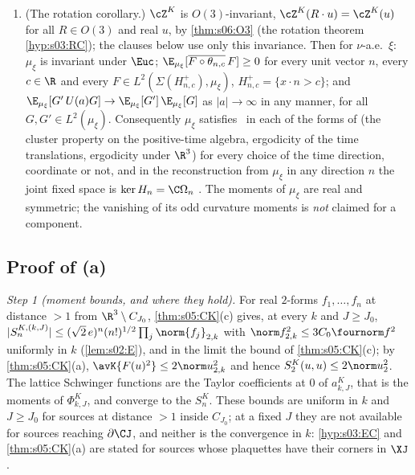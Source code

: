 \begin{theorem}
\begin{enumerate}[label=\textup{(\alph*)},leftmargin=*]
\item \textup{(The rotation corollary.)} $\cZ^K$ is $O(3)$-invariant, $\cZ^K(R\cdot u)=\cZ^K(u)$ for all $R\in O(3)$ and real $u$, by \cref{thm:s06:O3} (the rotation theorem \cref{hyp:s03:RC}); the clauses below use only this invariance. Then for $\nu$-a.e.\ $\xi$: $\mu_\xi$ is invariant under $\Euc$; $\E_{\mu_\xi}[\overline{F\circ\theta_{n,c}}\,F]\ge0$ for every unit vector $n$, every $c\in\R$ and every $F\in L^2(\Sigma(H^+_{n,c}),\mu_\xi)$, $H^+_{n,c}=\{x\cdot n>c\}$; and $\E_{\mu_\xi}[G'\,U(a)G]\to\E_{\mu_\xi}[G']\,\E_{\mu_\xi}[G]$ as $|a|\to\infty$ in any manner, for all $G,G'\in L^2(\mu_\xi)$. Consequently $\mu_\xi$ satisfies \OSf\ in each of the forms of \cite[def:OS4, add:OS4]{SymPhase} (the cluster property on the positive-time algebra, ergodicity of the time translations, ergodicity under $\R^3$) for every choice of the time direction, coordinate or not, and in the reconstruction from $\mu_\xi$ in any direction $n$ the joint fixed space is $\ker H_n=\C\Omega_n$ \cite[p:cor:rotcor]{SymPhase}. The moments of $\mu_\xi$ are real and symmetric; the vanishing of its odd curvature moments is \emph{not} claimed for a component.
\end{enumerate}
\end{theorem}

\subsection{Proof of (a)}

\emph{Step 1 (moment bounds, and where they hold).} For real $2$-forms $f_1,\dots,f_n$ at distance $>1$ from $\R^3\setminus C_{J_0}$, \cref{thm:s05:CK}(c) gives, at every $k$ and $J\ge J_0$, $|S^{K,(k,J)}_n|\le(\sqrt2\,e)^n(n!)^{1/2}\prod_j\norm{f_j}_{2,k}$ with $\norm f_{2,k}^2\le3C_0\fournorm f^2$ uniformly in $k$ (\cref{lem:s02:E}), and in the limit the bound of \cref{thm:s05:CK}(c); by \cref{thm:s05:CK}(a), $\avK{F(u)^2}\le2\norm u^2_{2,k}$ and hence $S^K_2(u,u)\le2\norm u_2^2$. The lattice Schwinger functions are the Taylor coefficients at $0$ of $a^K_{k,J}$, that is the moments of $\Phi^K_{k,J}$, and converge to the $S^K_n$. These bounds are uniform in $k$ and $J\ge J_0$ for sources at distance $>1$ inside $C_{J_0}$; at a fixed $J$ they are not available for sources reaching $\partial\CJ$, and neither is the convergence in $k$: \cref{hyp:s03:EC} and \cref{thm:s05:CK}(a) are stated for sources whose plaquettes have their corners in $\XJ$.


